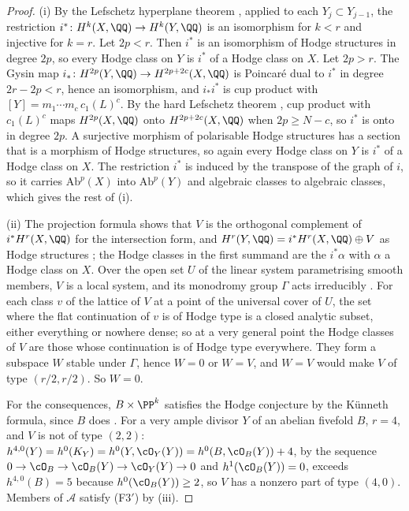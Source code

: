 \begin{proof}
(i) By the Lefschetz hyperplane theorem \cite[Chapter~1]{Voi03}, applied
to each $Y_{j}\subset Y_{j-1}$, the restriction $i^{*}\colon H^{k}(X,\QQ)\to
H^{k}(Y,\QQ)$ is an isomorphism for $k<r$ and injective for $k=r$. Let
$2p<r$. Then $i^{*}$ is an isomorphism of Hodge structures in degree $2p$,
so every Hodge class on $Y$ is $i^{*}$ of a Hodge class on $X$. Let $2p>r$.
The Gysin map $i_{*}\colon H^{2p}(Y,\QQ)\to H^{2p+2c}(X,\QQ)$ is Poincar\'e
dual to $i^{*}$ in degree $2r-2p<r$, hence an isomorphism, and
$i_{*}i^{*}$ is cup product with $[Y]=m_{1}\cdots m_{c}\,c_{1}(L)^{c}$. By the
hard Lefschetz theorem \cite[Chapter~6]{Voi02}, cup product with
$c_{1}(L)^{c}$ maps $H^{2p}(X,\QQ)$ onto $H^{2p+2c}(X,\QQ)$ when $2p\ge N-c$,
so $i^{*}$ is onto in degree $2p$. A surjective morphism of polarisable
Hodge structures has a section that is a morphism of Hodge structures, so
again every Hodge class on $Y$ is $i^{*}$ of a Hodge class on $X$. The
restriction $i^{*}$ is induced by the transpose of the graph of $i$, so it
carries $\mathrm{Ab}^{p}(X)$ into $\mathrm{Ab}^{p}(Y)$ and algebraic classes
to algebraic classes, which gives the rest of (i).

(ii) The projection formula shows that $V$ is the orthogonal complement of
$i^{*}H^{r}(X,\QQ)$ for the intersection form, and
$H^{r}(Y,\QQ)=i^{*}H^{r}(X,\QQ)\oplus V$ as Hodge structures
\cite[Chapter~2]{Voi03}; the Hodge classes in the first summand are the
$i^{*}\alpha$ with $\alpha$ a Hodge class on $X$. Over the open set $U$ of
the linear system parametrising smooth members, $V$ is a local system, and
its monodromy group $\Gamma$ acts irreducibly \cite[Chapter~3]{Voi03}. For
each class $v$ of the lattice of $V$ at a point of the universal cover of
$U$, the set where the flat continuation of $v$ is of Hodge type is a closed
analytic subset, either everything or nowhere dense; so at a very general
point the Hodge classes of $V$ are those whose continuation is of Hodge type
everywhere. They form a subspace $W$ stable under $\Gamma$, hence $W=0$ or
$W=V$, and $W=V$ would make $V$ of type $(r/2,r/2)$. So $W=0$.

For the consequences, $B\times\PP^{k}$ satisfies the Hodge conjecture by the
K\"unneth formula, since $B$ does \cite{Mar25a,Mar25b,MZ99}. For a very ample
divisor $Y$ of an abelian fivefold $B$, $r=4$, and $V$ is not of type $(2,2)$:
$h^{4,0}(Y)=h^{0}(K_{Y})=h^{0}(Y,\cO_{Y}(Y))=h^{0}(B,\cO_{B}(Y))+4$, by the
sequence $0\to\cO_{B}\to\cO_{B}(Y)\to\cO_{Y}(Y)\to0$ and $h^{1}(\cO_{B}(Y))=0$,
exceeds $h^{4,0}(B)=5$ because $h^{0}(\cO_{B}(Y))\ge2$, so $V$ has a nonzero
part of type $(4,0)$. Members of $\mathcal{A}$ satisfy \textup{(F3$'$)} by
(iii).
\end{proof}


